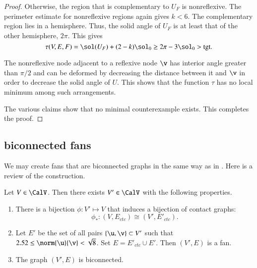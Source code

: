 \documentclass{llncs}
\def\op#1{{\hbox{#1}}}
\begin{document}
\begin{proof}
  Otherwise, the region that is complementary
to $U_F$ is nonreflexive.  The perimeter estimate for nonreflexive regions again
gives $k<6$.  The complementary region lies in a hemisphere.  Thus,
the solid angle of $U_F$ is at least that of the other hemisphere,
$2\pi$.
%
This gives
\[
\tau(V,E,F) = \sol(U_F) + (2-k)\sol_0 \ge 2\pi - 3\sol_0 > \op{tgt}.
\]


The nonreflexive node adjacent to a reflexive node $\v$ has interior angle greater
than $\pi/2$ and can be deformed by decreasing the distance between it
and $\v$ in order to decrease the solid angle of $U$.  This shows that the
function $\tau$ has no local minimum among such arrangements.


The various claims show that no minimal counterexample exists.  This
completes the proof.
\end{proof}

\subsection{biconnected fans}


We may create  fans that are biconnected graphs in the same way as in
\cite{Hales:2006:DCG}.  Here is a review
of the construction.



\begin{lemma}\label{lemma:V'-bi} 
Let $V\in \CalV$.  Then there exists $V'\in \CalV$ with
  the following  properties.
\begin{enumerate}\wasitemize 
\item There is a bijection $\phi:V'\mapsto V$ that induces a bijection
  of contact graphs:
\[
\phi_*:(V,E_{ctc}) \cong (V',E'_{ctc}).
\]
\item Let $E'$ be the set of all pairs $\{\u,\v\}\subset V'$
  such that $2.52\le\norm{\u}{\v} <\sqrt8$.  Set $E =
  E'_{ctc}\cup E'$.  Then $(V',E)$ is a fan.
\item The graph $(V',E)$ is biconnected.
\end{enumerate}\wasitemize 
\end{lemma}
\end{document}
